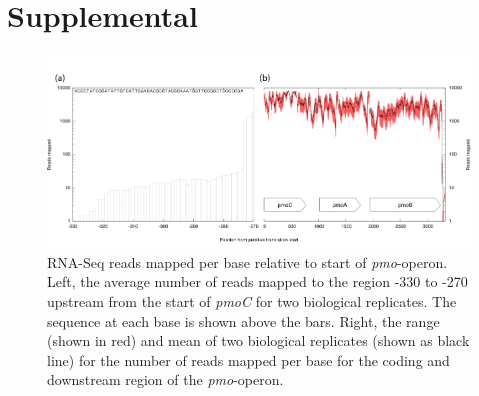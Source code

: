 \section{Supplemental}


\begin{figure}[H]
\centering
     \includegraphics[width=1.0\textwidth]{./tex/chapter1/figures/supplemental/FigureS1.png}
     \begin{singlespace}
     \caption[RNA-Seq reads mapped per base relative to start of \textit{pmo}-operon.]{
        RNA-Seq reads mapped per base relative to start of \textit{pmo}-operon.
        Left, the average number of reads mapped to the region -330 to -270 upstream from the start of \textit{pmoC} for two biological replicates.
        The sequence at each base is shown above the bars.
        Right, the range (shown in red) and mean of two biological replicates (shown as black line) for the number of reads mapped per base for the coding and downstream region of the \textit{pmo}-operon.}
     \label{fig:S1} %
     \end{singlespace}
\end{figure}

